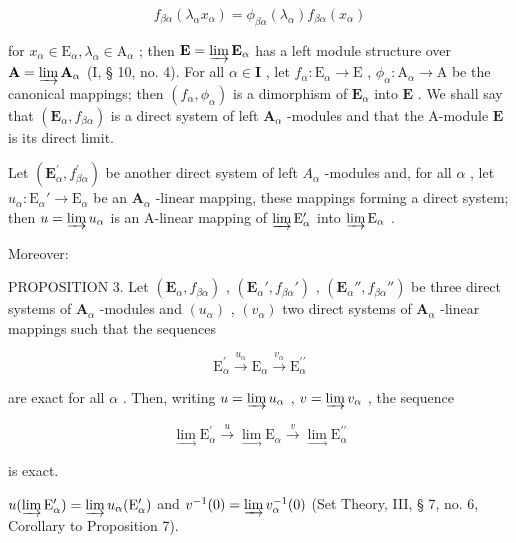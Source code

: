 \[
f _ {\beta \alpha} (\lambda_ {\alpha} x _ {\alpha}) = \phi_ {\beta \alpha} (\lambda_ {\alpha}) f _ {\beta \alpha} (x _ {\alpha})\tag{4}
\]

for \(x_{\alpha} \in \mathrm{E}_{\alpha}, \lambda_{\alpha} \in \mathrm{A}_{\alpha}\) ; then \(\mathbf{E} = \varinjlim \mathbf{E}_{\alpha}\) has a left module structure over \(\mathbf{A} = \varinjlim \mathbf{A}_{\alpha}\) (I, § 10, no. 4). For all \(\alpha \in \mathbf{I}\) , let \(f_{\alpha}: \mathrm{E}_{\alpha} \to \mathrm{E}\) , \(\phi_{\alpha}: \mathrm{A}_{\alpha} \to \mathrm{A}\) be the canonical mappings; then \((f_{\alpha}, \phi_{\alpha})\) is a dimorphism of \(\mathbf{E}_{\alpha}\) into \(\mathbf{E}\) . We shall say that \((\mathbf{E}_{\alpha}, f_{\beta \alpha})\) is a direct system of left \(\mathbf{A}_{\alpha}\) -modules and that the A-module \(\mathbf{E}\) is its direct limit.

Let \((\mathbf{E}_{\alpha}^{\prime}, f_{\beta \alpha}^{\prime})\) be another direct system of left \(A_{\alpha}\) -modules and, for all \(\alpha\) , let \(u_{\alpha}: \mathrm{E}_{\alpha}' \to \mathrm{E}_{\alpha}\) be an \(\mathbf{A}_{\alpha}\) -linear mapping, these mappings forming a direct system; then \(u = \varinjlim u_{\alpha}\) is an A-linear mapping of \(\varinjlim \mathrm{E}_{\alpha}'\) into \(\varinjlim \mathrm{E}_{\alpha}\) .

Moreover:

PROPOSITION 3. Let \((\mathbf{E}_{\alpha}, f_{\beta \alpha})\) , \((\mathbf{E}_{\alpha}', f_{\beta \alpha}')\) , \((\mathbf{E}_{\alpha}'', f_{\beta \alpha}'')\) be three direct systems of \(\mathbf{A}_{\alpha}\) -modules and \((u_{\alpha})\) , \((v_{\alpha})\) two direct systems of \(\mathbf{A}_{\alpha}\) -linear mappings such that the sequences

\[
\mathrm{E} _ {\alpha} ^ {\prime} \xrightarrow {u _ {\alpha}} \mathrm{E} _ {\alpha} \xrightarrow {v _ {\alpha}} \mathrm{E} _ {\alpha} ^ {\prime \prime}
\]

are exact for all \(\alpha\) . Then, writing \(u = \varinjlim u_{\alpha}\) , \(v = \varinjlim v_{\alpha}\) , the sequence

\[
\lim _ {\longrightarrow} \mathrm{E} _ {\alpha} ^ {\prime} \xrightarrow {u} \lim _ {\longrightarrow} \mathrm{E} _ {\alpha} \xrightarrow {v} \lim _ {\longrightarrow} \mathrm{E} _ {\alpha} ^ {\prime \prime}
\]

is exact.

\(u(\varinjlim \mathrm{E}_{\alpha}^{\prime}) = \varinjlim u_{\alpha}(\mathrm{E}_{\alpha}^{\prime})\) and \(v^{-1}(0) = \varinjlim v_{\alpha}^{-1}(0)\) (Set Theory, III, § 7, no. 6, Corollary to Proposition 7).

